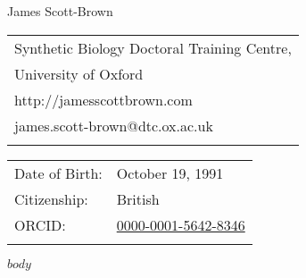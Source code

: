 \documentclass[letterpaper]{article}
\def\name{James Scott-Brown}
\begin{document}
{\huge \name}


\vspace{0.25in}
\begin{minipage}[t]{0.5\textwidth}
\begin{tabular}{l}  	
Synthetic Biology Doctoral Training Centre,\\
University of Oxford\\
http://jamesscottbrown.com\\
james.scott-brown@dtc.ox.ac.uk \\ \\
\end{tabular}
\end{minipage}
\begin{minipage}[t]{0.5\textwidth}
\begin{tabular}{ll}  	
Date of Birth: &October 19, 1991 \\
Citizenship: &British \\
ORCID: &\href{https://orcid.org/0000-0001-5642-8346}{0000-0001-5642-8346} \\ \\
\end{tabular}
\end{minipage}

$body$

\vspace{0.3 cm}
\end{document}
